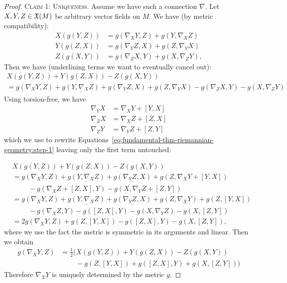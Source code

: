 \begin{proof}
\textsc{Claim 1: Uniqueness.} Assume we have such a connection
$\nabla$. Let $X,Y,Z\in\mathfrak{X}(M)$ be arbitrary vector fields on $M$. We
have (by metric compatibility):
\begin{subequations}
  \begin{align}
X(g(Y,Z)) &= g(\nabla_{X}Y,Z) + g(Y,\nabla_{X}Z)\\ 
Y(g(Z,X)) &= g(\nabla_{Y}Z,X) + g(Z,\nabla_{Y}X)\\ 
Z(g(X,Y)) &=g(\nabla_{Z}X,Y) + g(X,\nabla_{Z}Y), 
  \end{align}
\end{subequations}
Then we have (underlining terms we want to eventually cancel out):
\begin{multline}\label{eq:fundamental-thm-riemannian-geometry:step-1}
X(g(Y,Z))+Y(g(Z,X))-Z(g(X,Y))\\
=g(\nabla_{X}Y,Z) + \underline{g(Y,\nabla_{X}Z)} + \underline{g(\nabla_{Y}Z,X)} + g(Z,\nabla_{Y}X)
- g(\nabla_{Z}X,Y) - g(X,\nabla_{Z}Y)
\end{multline}
Using torsion-free, we have
\begin{subequations}
  \begin{align}
\nabla_{Y}X &= \nabla_{X}Y + [Y,X]\\
\nabla_{Z}X &= \nabla_{X}Z + [Z,X]\\
\nabla_{Z}Y &= \nabla_{Y}Z + [Z,Y]
  \end{align}
\end{subequations}
which we use to rewrite Equations~\eqref{eq:fundamental-thm-riemannian-geometry:step-1}
leaving only the first term untouched:

\begin{subequations}
  \begin{align}
&X(g(Y,Z))+Y(g(Z,X))-Z(g(X,Y))\nonumber\\
&=g(\nabla_{X}Y,Z) + \underline{g(Y,\nabla_{X}Z)} + \underline{g(\nabla_{Y}Z,X)} + g(Z,\nabla_{X}Y + [Y,X])\nonumber\\
&\phantom{=\quad}- g(\nabla_{X}Z + [Z,X],Y) - g(X,\nabla_{Y}Z + [Z,Y])\\
&=g(\nabla_{X}Y,Z) + \underline{g(Y,\nabla_{X}Z)} + \underline{g(\nabla_{Y}Z,X)} + g(Z,\nabla_{X}Y) + g(Z,[Y,X])\nonumber\\
&\phantom{=\quad}- g(\nabla_{X}Z, Y) - g([Z,X],Y) - g(X,\nabla_{Y}Z) - g(X, [Z,Y])\\
&=2g(\nabla_{X}Y,Z) + g(Z,[Y,X]) - g([Z,X],Y)  - g(X, [Z,Y]),
  \end{align}
\end{subequations}
where we use the fact the metric is symmetric in its arguments and linear.
Then we obtain
\begin{equation}\label{eq:fundamental-thm-riemannian-geometry:key-result}
\begin{split}
g(\nabla_{X}Y,Z) &= \frac{1}{2}\biggl(X(g(Y,Z))+Y(g(Z,X))-Z(g(X,Y))\\
&\phantom{=\frac{1}{2}\biggl(}- g(Z,[Y,X]) + g([Z,X],Y)  + g(X, [Z,Y])\biggr)
\end{split}
\end{equation}
Therefore $\nabla_{X}Y$ is uniquely determined by the metric $g$.


\end{proof}
